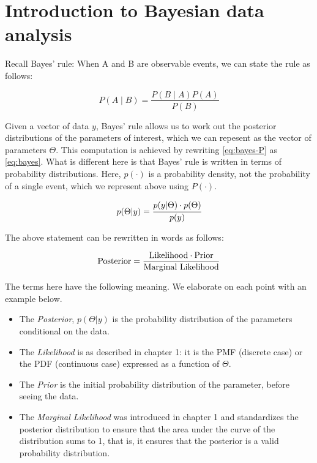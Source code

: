 \documentclass[12pt,]{krantz}
\theoremstyle{definition}
\theoremstyle{definition}
\theoremstyle{definition}
\theoremstyle{remark}
\begin{document}
\hypertarget{introBDA}{%
\chapter{Introduction to Bayesian data analysis}\label{introBDA}}

Recall Bayes' rule: When A and B are observable events,
we can state the rule as follows:

\begin{equation}
P(A\mid B) = \frac{P(B\mid A) P(A)}{P(B)}
\label{eq:bayes-P}
\end{equation}

Given a vector of data \(y\), Bayes' rule allows us to work out the posterior distributions of the parameters of interest, which we can repesent as the vector of parameters \(\Theta\). This computation is achieved by rewriting \eqref{eq:bayes-P} as \eqref{eq:bayes}. What is different here is that Bayes' rule is written in terms of probability distributions. Here, \(p(\cdot)\) is a probability density, not the probability of a single event, which we represent above using \(P(\cdot)\).

\begin{equation}
p(\Theta|y) = \cfrac{ p(y|\Theta) \cdot p(\Theta) }{p(y)}
\label{eq:bayes}
\end{equation}

The above statement can be rewritten in words as follows:

\begin{equation}
\hbox{Posterior} = \frac{\hbox{Likelihood} \cdot \hbox{Prior}}{\hbox{Marginal Likelihood}}
\end{equation}

The terms here have the following meaning. We elaborate on each point with an example below.

\begin{itemize}
\item
  The \emph{Posterior}, \(p(\Theta|y)\) is the probability distribution of the parameters conditional on the data.
\item
  The \emph{Likelihood} is as described in chapter 1: it is the PMF (discrete case) or the PDF (continuous case) expressed as a function of \(\Theta\).
\item
  The \emph{Prior} is the initial probability distribution of the parameter, before seeing the data.
\item
  The \emph{Marginal Likelihood} was introduced in chapter 1 and standardizes the posterior distribution to ensure that the area under the curve of the distribution sums to 1, that is, it ensures that the posterior is a valid probability distribution.
\end{itemize}
\end{document}
